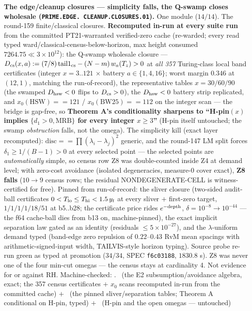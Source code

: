 \documentclass[11pt,a4paper]{article}
\theoremstyle{definition}
\begin{document}
\par\smallskip\noindent\textbf{The edge/cleanup closures ---
simplicity falls, the Q-swamp closes wholesale
(\texttt{PRIME.\allowbreak EDGE.\allowbreak
CLEANUP.\allowbreak CLOSURES.01}).}
One module ($14/14$).  The round-159 finite/classical closures.
\textbf{Recomputed in-run at every suite run} from the committed
PT21-warranted verified-zero cache (re-warded; every read typed
ward/classical-census-below-horizon, max height consumed
$7264.75 \ll 3\times10^{12}$): the Q-swamp wholesale closure ---
$D_{\rm cs}(x, a) := (7/8)\,\mathrm{tail1}_{\rm cs} - (N -
m)\,w_a(T_z) > 0$ at \emph{all 357} Turing-class local band
certificates (integer $x = 3..121$ $\times$ battery $a \in \{1,
4, 16\}$; worst margin $0.346$ at $(12, 1)$, matching the
run-of-record), the representative tables $x = 30/60/90$ (the
swamped $D_{\rm hsw} < 0$ flips to $D_{\rm cs} > 0$), the
$D_{\rm hsw} < 0$ battery strip replicated, and $x_0(\mathrm{HSW})
== 121$ / $x_0(\mathrm{BW25}) == 112$ on the integer scan ---
the bridge is gap-free, so \textbf{Theorem A's conditionality
sharpens to ``H-pin$(x)$ implies $\{d_1 > 0, \mathrm{MRB}\}$ for
every integer $x \ge 3$''} (H-pin itself untouched; the swamp
\emph{obstruction} falls, not the omega).  The simplicity kill
(exact layer recomputed): $\mathrm{disc} == \prod(\lambda_i -
\lambda_j)^2$ generic, and the round-147 LM split forces
$\delta_1 \ge 1/(B-1) > 0$ at every selected point --- the
selected points are \emph{automatically} simple, so census row
Z8 was double-counted inside Z4 at demand level; with zero-cost
avoidance (isolated degeneracies, measure-0 cover exact),
\textbf{Z8 falls} ($10 \to 9$ census rows; the residual
NONDEGENERATE-CELL is witness-certified for free).  Pinned from
run-of-record: the sliver closure (two-sided audit-ball
certificates $0 < T_{\rm lo} \le T_{\rm hi} < 1.5\,y_t$ at every
sliver $+$ first-zero target, $1/1/1/1/18/51$ at b5..b28; the
certificate price rides $e^{-\rm depth}$, $\delta = 10^{-8} \to
10^{-44}$ --- the f64 cache-ball dies from b13 on,
machine-pinned), the exact implicit separation law gated as an
identity (residuals $\le 5\times10^{-27}$), and the
$\lambda$-uniform demand typed (band-edge zero repulsion of
$0.22$--$0.43$ RvM mean spacings with arithmetic-signed-input
width, TAILVIS-style horizon typing).  Source probe re-run green
as typed at promotion ($34/34$, SPEC \texttt{f6c03188},
$1830.8$ s).  Z8 was never one of the four min-cut omegas ---
the census stays at cardinality 4.  Not evidence for or against
RH.
Machine-checked: .
\mE\ (the E2 subsumption/avoidance algebra, exact; the 357
census certificates $+$ $x_0$ scans recomputed in-run from the
committed cache) $+$ \mC\ (the pinned sliver/separation tables;
Theorem A conditional on H-pin, typed) $+$ \mO\ (H-pin and the
open omegas --- untouched)
\par\smallskip
\end{document}
